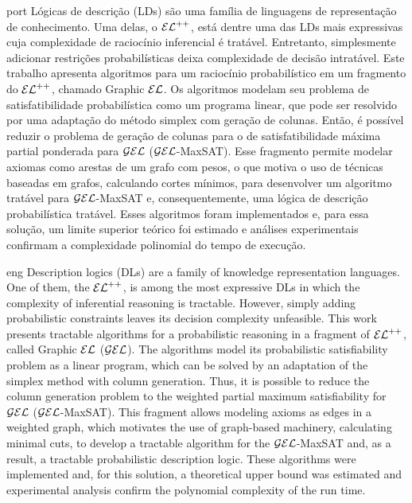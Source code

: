 
\begin{resumo}{port}
  Lógicas de descrição (LDs) são uma família de linguagens de representação de conhecimento. Uma delas, o $\mathcal{EL}^{++}$, está dentre uma das LDs mais expressivas cuja complexidade de raciocínio inferencial é tratável. Entretanto, simplesmente adicionar restrições probabilísticas deixa complexidade de decisão intratável. Este trabalho apresenta algoritmos para um raciocínio probabilístico em um fragmento do $\mathcal{EL}^{++}$, chamado Graphic $\mathcal{EL}$. Os algoritmos modelam seu problema de satisfatibilidade probabilística como um programa linear, que pode ser resolvido por uma adaptação do método simplex com geração de colunas. Então, é possível reduzir o problema de geração de colunas para o de satisfatibilidade máxima partial ponderada para $\mathcal{GEL}$ ($\mathcal{GEL}$-MaxSAT). Esse fragmento permite modelar axiomas como arestas de um grafo com pesos, o que motiva o uso de técnicas baseadas em grafos, calculando cortes mínimos, para desenvolver um algoritmo tratável para $\mathcal{GEL}$-MaxSAT e, consequentemente, uma lógica de descrição probabilística tratável. Esses algoritmos foram implementados e, para essa solução, um limite superior teórico foi estimado e análises experimentais confirmam a complexidade polinomial do tempo de execução.  
\end{resumo}

\begin{resumo}{eng}
  Description logics (DLs) are a family of knowledge representation languages. One of them, the $\mathcal{EL}^{++}$, is among the most expressive DLs in which the complexity of inferential reasoning is tractable. However, simply adding probabilistic constraints leaves its decision complexity unfeasible. This work presents tractable algorithms for a probabilistic reasoning in a fragment of $\mathcal{EL}^{++}$, called Graphic $\mathcal{EL}$ ($\mathcal{GEL}$). The algorithms model its probabilistic satisfiability problem as a linear program, which can be solved by an adaptation of the simplex method with column generation. Thus, it is possible to reduce the column generation problem to the weighted partial maximum satisfiability for $\mathcal{GEL}$ ($\mathcal{GEL}$-MaxSAT). This fragment allows modeling axioms as edges in a weighted graph, which motivates the use of graph-based machinery, calculating minimal cuts, to develop a tractable algorithm for the $\mathcal{GEL}$-MaxSAT and, as a result, a tractable probabilistic description logic. These algorithms were implemented and, for this solution, a theoretical upper bound was estimated and experimental analysis confirm the polynomial complexity of the run time. 
\end{resumo}

